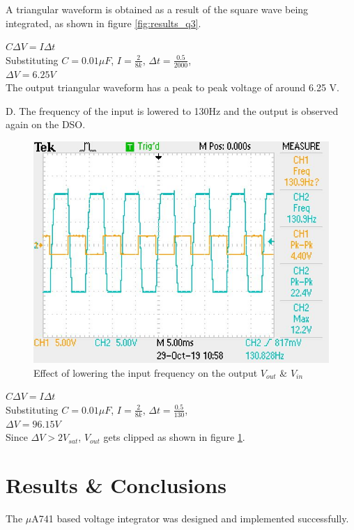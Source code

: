 \documentclass[12pt, titlepage]{article}
\theoremstyle{definition}
\begin{document}
    A triangular waveform is obtained as a result of the square wave being integrated, as shown in figure \ref{fig:results_q3}.

    $C\Delta V=I\Delta t$\\
    Substituting $C=0.01\mu F$, $I=\frac{2}{8k}$, $\Delta t=\frac{0.5}{2000}$, \\
    $\Delta V = 6.25 V$\\
    The output triangular waveform has a peak to peak voltage of around 6.25 V.

    D. The frequency of the input is lowered to 130Hz and the output is observed again on the DSO.

    \begin{figure}
      \includegraphics[scale=0.25]{images/results_q4_2.jpeg}
      \caption{Effect of lowering the input frequency on the output \color{cyan}$V_{out}$ \color{black}\& \color{orange}$V_{in}$}
      \label{fig:results_q4}
    \end{figure}

    $C\Delta V=I\Delta t$\\
    Substituting $C=0.01\mu F$, $I=\frac{2}{8k}$, $\Delta t=\frac{0.5}{130}$, \\
    $\Delta V = 96.15 V$ \\
    Since $\Delta V > 2V_{sat}$, $V_{out}$ gets clipped as shown in figure \ref{fig:results_q4}.


  \newpage
  \section{Results \& Conclusions}
  The $\mu$A741 based voltage integrator was designed and implemented successfully.
\end{document}

